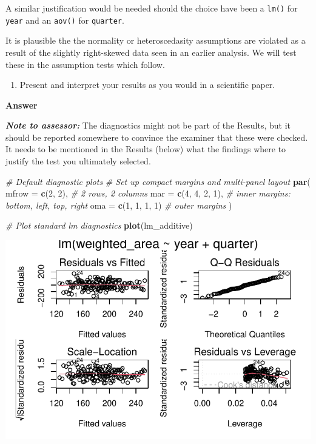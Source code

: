 \documentclass[
  british,
  10pt,
]{article}
\newenvironment{Shaded}{\begin{snugshade}}{\end{snugshade}}
\newcommand{\AttributeTok}[1]{\textcolor[rgb]{0.13,0.29,0.53}{#1}}
\newcommand{\CommentTok}[1]{\textcolor[rgb]{0.56,0.35,0.01}{\textit{#1}}}
\newcommand{\DecValTok}[1]{\textcolor[rgb]{0.00,0.00,0.81}{#1}}
\newcommand{\FunctionTok}[1]{\textcolor[rgb]{0.13,0.29,0.53}{\textbf{#1}}}
\newcommand{\NormalTok}[1]{#1}
\providecommand{\tightlist}{%
  \setlength{\itemsep}{0pt}\setlength{\parskip}{0pt}}
\let\oldtexttt\texttt
\renewcommand{\texttt}[1]{\oldtexttt{\small #1}}
\begin{document}
A similar justification would be needed should the choice have been a
\texttt{lm()} for \texttt{year} and an \texttt{aov()} for
\texttt{quarter}.

It is plausible the the normality or heteroscedasity assumptions are
violated as a result of the slightly right-skewed data seen in an
earlier analysis. We will test these in the assumption tests which
follow.

\begin{enumerate}
\def\labelenumi{\arabic{enumi}.}
\setcounter{enumi}{3}
\tightlist
\item
  Present and interpret your results as you would in a scientific paper.
\end{enumerate}

\textbf{Answer}

\textbf{\emph{Note to assessor:}} The diagnostics might not be part of
the Results, but it should be reported somewhere to convince the
examiner that these were checked. It needs to be mentioned in the
Results (below) what the findings where to justify the test you
ultimately selected.

\begin{Shaded}
\begin{Highlighting}[]
\CommentTok{\# Default diagnostic plots}
\CommentTok{\# Set up compact margins and multi{-}panel layout}
\FunctionTok{par}\NormalTok{(}
  \AttributeTok{mfrow =} \FunctionTok{c}\NormalTok{(}\DecValTok{2}\NormalTok{, }\DecValTok{2}\NormalTok{),     }\CommentTok{\# 2 rows, 2 columns}
  \AttributeTok{mar =} \FunctionTok{c}\NormalTok{(}\DecValTok{4}\NormalTok{, }\DecValTok{4}\NormalTok{, }\DecValTok{2}\NormalTok{, }\DecValTok{1}\NormalTok{), }\CommentTok{\# inner margins: bottom, left, top, right}
  \AttributeTok{oma =} \FunctionTok{c}\NormalTok{(}\DecValTok{1}\NormalTok{, }\DecValTok{1}\NormalTok{, }\DecValTok{1}\NormalTok{, }\DecValTok{1}\NormalTok{)  }\CommentTok{\# outer margins}
\NormalTok{)}

\CommentTok{\# Plot standard lm diagnostics}
\FunctionTok{plot}\NormalTok{(lm\_additive)}
\end{Highlighting}
\end{Shaded}

\begin{center}
\includegraphics[width=0.6\linewidth,height=\textheight,keepaspectratio]{BCB744_Biostats_Prac_Exam_2025_files/figure-pdf/chunk12-1.pdf}
\end{center}
\end{document}

